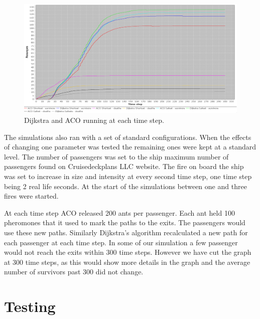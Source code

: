 \begin{figure} [h]
\centering
\hspace*{-1.0in}
\includegraphics[scale=0.35]{images/Graph-using-200-rounds-140-passangers-and-one-fire.png}
\caption{Dijkstra and ACO running at each time step.}
\label{fig:celeb}
\end{figure}
The simulations also ran with a set of standard configurations. When the effects of changing one parameter was tested the remaining ones were kept at a standard level. The number of passengers was set to the ship maximum number of passengers found on Cruisedeckplans LLC website\cite{cruseships}. The fire on board the ship was set to increase in size and intensity at every second time step, one time step being 2 real life seconds. At the start of the simulations between one and three fires were started.

At each time step ACO released 200 ants per passenger. Each ant held 100 pheromones that it used to mark the paths to the exits. The passengers would use these new paths. Similarly Dijkstra's algorithm recalculated a new path for each passenger at each time step. In some of our simulation a few passenger would not reach the exits within 300 time steps. However we have cut the graph at 300 time steps, as this would show more details in the graph and the average number of survivors past 300 did not change. 

\section{Testing}

